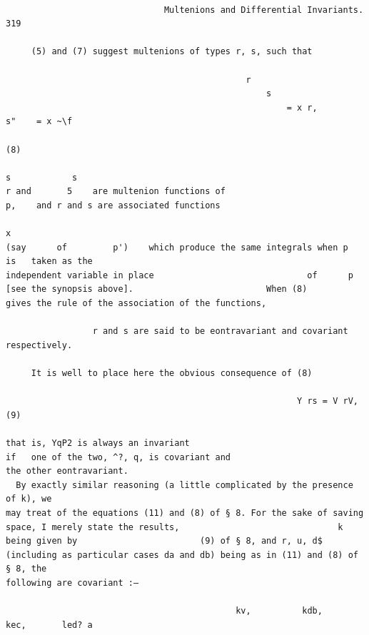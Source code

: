 \documentclass[10pt]{article}
\begin{document}
\begin{verbatim}

                               Multenions and Differential Invariants.                                                           319

     (5) and (7) suggest multenions of types r, s, such that

                                               r
                                                   s
                                                       = x r,               s"    = x ~\f
                                                                                                                                 (8)
                                                                                        s            s
r and       5    are multenion functions of                            p,    and r and s are associated functions
                                                                                                             x
(say      of         p')    which produce the same integrals when p                                              is   taken as the
independent variable in place                              of      p [see the synopsis above].                          When (8)
gives the rule of the association of the functions,

                 r and s are said to be eontravariant and covariant respectively.

     It is well to place here the obvious consequence of (8)

                                                         Y rs = V rV,                                                            (9)

that is, YqP2 is always an invariant                                   if   one of the two, ^?, q, is covariant and
the other eontravariant.
  By exactly similar reasoning (a little complicated by the presence of k), we
may treat of the equations (11) and (8) of § 8. For the sake of saving
space, I merely state the results,                               k being given by                        (9) of § 8, and r, u, d$
(including as particular cases da and db) being as in (11) and (8) of § 8, the
following are covariant :—

                                             kv,          kdb,                   kec,       led? a


\end{verbatim}
\end{document}
